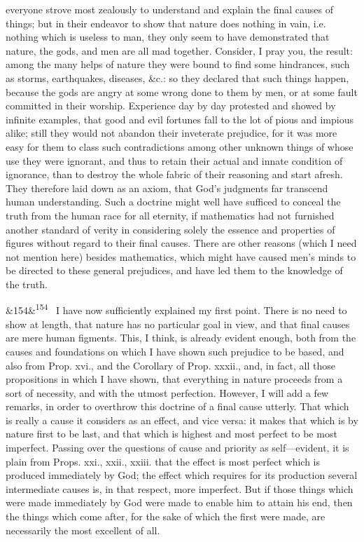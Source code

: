 \documentclass[12pt]{article}
\newcommand{\para}[1][]{\par\noindent\ifx&#1&\else\textsuperscript{\footnotesize #1}~\fi}
\begin{document}
everyone strove most zealously to understand and explain the final causes of things; but in their endeavor to show that nature does nothing in vain, i.e. nothing which is useless to man, they only seem to have demonstrated that nature, the gods, and men are all mad together. Consider, I pray you, the result: among the many helps of nature they were bound to find some hindrances, such as storms, earthquakes, diseases, \&c.: so they declared that such things happen, because the gods are angry at some wrong done to them by men, or at some fault committed in their worship. Experience day by day protested and showed by infinite examples, that good and evil fortunes fall to the lot of pious and impious alike; still they would not abandon their inveterate prejudice, for it was more easy for them to class such contradictions among other unknown things of whose use they were ignorant, and thus to retain their actual and innate condition of ignorance, than to destroy the whole fabric of their reasoning and start afresh. They therefore laid down as an axiom, that God's judgments far transcend human understanding. Such a doctrine might well have sufficed to conceal the truth from the human race for all eternity, if mathematics had not furnished another standard of verity in considering solely the essence and properties of figures without regard to their final causes. There are other reasons (which I need not mention here) besides mathematics, which might have caused men's minds to be directed to these general prejudices, and have led them to the knowledge of the truth.

\para[154] I have now sufficiently explained my first point. There is no need to show at length, that nature has no particular goal in view, and that final causes are mere human figments. This, I think, is already evident enough, both from the causes and foundations on which I have shown such prejudice to be based, and also from Prop. xvi., and the Corollary of Prop. xxxii., and, in fact, all those propositions in which I have shown, that everything in nature proceeds from a sort of necessity, and with the utmost perfection. However, I will add a few remarks, in order to overthrow this doctrine of a final cause utterly. That which is really a cause it considers as an effect, and vice versa: it makes that which is by nature first to be last, and that which is highest and most perfect to be most imperfect. Passing over the questions of cause and priority as self---evident, it is plain from Props. xxi., xxii., xxiii. that the effect is most perfect which is produced immediately by God; the effect which requires for its production several intermediate causes is, in that respect, more imperfect. But if those things which were made immediately by God were made to enable him to attain his end, then the things which come after, for the sake of which the first were made, are necessarily the most excellent of all.
\end{document}
